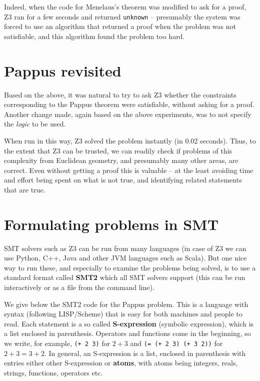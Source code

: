 \documentclass{amsart}
\theoremstyle{plain}
\theoremstyle{definition}
\theoremstyle{remark}
\begin{document}
Indeed, when the code for Menelaus's theorem was modified to ask for a
proof, Z3 ran for a few seconds and returned \texttt{unknown} --
presumably the system was forced to use an algorithm that returned a
proof when the problem was not satisfiable, and this algorithm found the
problem too hard.

\hypertarget{pappus-revisited}{%
	\section{Pappus revisited}\label{pappus-revisited}}

Based on the above, it was natural to try to ask Z3 whether the
constraints corresponding to the Pappus theorem were satisfiable,
without asking for a proof. Another change made, again based on the
above experiments, was to not specify the \emph{logic} to be used.

When run in this way, Z3 solved the problem instantly (in 0.02 seconds).
Thus, to the extent that Z3 can be trusted, we can readily check if
problems of this complexity from Euclidean geometry, and presumably many
other areas, are correct. Even without getting a proof this is valuable
-- at the least avoiding time and effort being spent on what is not
true, and identifying related statements that are true.

\hypertarget{formulating-problems-in-smt}{%
	\section{Formulating problems in
	  SMT}\label{formulating-problems-in-smt}}

SMT solvers such as Z3 can be run from many languages (in case of Z3 we
can use Python, C++, Java and other JVM languages such as Scala). But
one nice way to run these, and especially to examine the problems being
solved, is to use a standard format called \textbf{SMT2} which all SMT
solvers support (this can be run interactively or as a file from the
command line).

We give below the SMT2 code for the Pappus problem. This is a language
with syntax (following LISP/Scheme) that is easy for both machines and
people to read. Each statement is a so called \textbf{S-expression}
(symbolic expression), which is a list enclosed in parenthesis.
Operators and functions come in the beginning, so we write, for example,
\texttt{(+\ 2\ 3)} for \(2 + 3\) and \texttt{(=\ (+\ 2\ 3)\ (+\ 3\ 2))}
for \(2 + 3 = 3 + 2\). In general, an S-expression is a list, enclosed
in parenthesis with entries either other S-expression or \textbf{atoms},
with atoms being integers, reals, strings, functions, operators etc.
\end{document}
